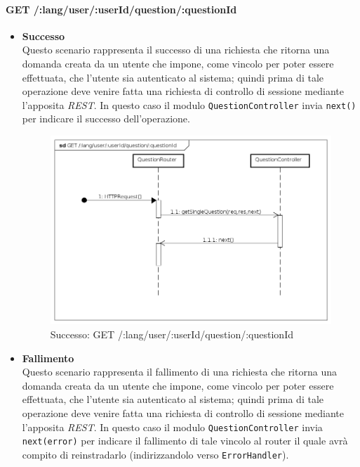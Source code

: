 \paragraph{GET /:lang/user/:userId/question/:questionId}
\begin{itemize}
\item \textbf{Successo}\\
Questo scenario rappresenta il successo di una richiesta che ritorna una domanda creata da un utente che impone, come vincolo per poter essere effettuata, che l'utente sia autenticato al sistema; quindi prima di tale operazione deve venire fatta una richiesta di controllo di sessione mediante l'apposita \textit{REST}. In questo caso il modulo \texttt{QuestionController} invia \texttt{next()} per indicare il successo dell'operazione.


\begin{figure}[ht]
	\centering
	\includegraphics[scale=0.45]{UML/DiagrammiDiSequenza/Back-end/GET__lang_user__userId_question__questionId_success.png}
	\caption{Successo: GET /:lang/user/:userId/question/:questionId}
\end{figure}
\FloatBarrier

\item \textbf{Fallimento}\\
Questo scenario rappresenta il fallimento di una richiesta che ritorna una domanda creata da un utente che impone, come vincolo per poter essere effettuata, che l'utente sia autenticato al sistema; quindi prima di tale operazione deve venire fatta una richiesta di controllo di sessione mediante l'apposita \textit{REST}. In questo caso il modulo \texttt{QuestionController} invia \texttt{next(error)} per indicare il fallimento di tale vincolo al router il quale avrà compito di reinstradarlo (indirizzandolo verso \texttt{ErrorHandler}).


\end{itemize}
